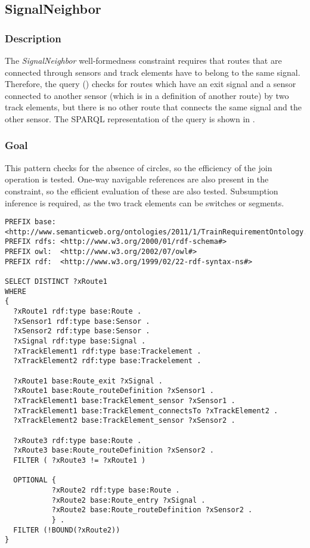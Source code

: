 \subsection{SignalNeighbor}

\subsubsection{Description} The \textit{SignalNeighbor} well-formedness constraint requires that routes that are connected through sensors and track elements have to belong to the same signal. Therefore, the query () checks for routes which have an exit signal and a sensor connected to another sensor (which is in a definition of another route) by two track elements, but there is no other route that connects the same signal and the other sensor. The SPARQL representation of the query is shown in .

\subsubsection{Goal} This pattern checks for the absence of circles, so the efficiency of the join operation is tested. One-way navigable references are also present in the constraint, so the efficient evaluation of these are also tested. Subsumption inference is required, as the two track elements can be switches or segments.

\begin{lstlisting}[caption=The RouteSensor query in SPARQL, label=lst:signalneighbor-sparql]
PREFIX base: <http://www.semanticweb.org/ontologies/2011/1/TrainRequirementOntology.owl#>
PREFIX rdfs: <http://www.w3.org/2000/01/rdf-schema#>
PREFIX owl:  <http://www.w3.org/2002/07/owl#>
PREFIX rdf:  <http://www.w3.org/1999/02/22-rdf-syntax-ns#>

SELECT DISTINCT ?xRoute1
WHERE
{
  ?xRoute1 rdf:type base:Route .
  ?xSensor1 rdf:type base:Sensor .
  ?xSensor2 rdf:type base:Sensor .
  ?xSignal rdf:type base:Signal .
  ?xTrackElement1 rdf:type base:Trackelement .
  ?xTrackElement2 rdf:type base:Trackelement .
  
  ?xRoute1 base:Route_exit ?xSignal .
  ?xRoute1 base:Route_routeDefinition ?xSensor1 .
  ?xTrackElement1 base:TrackElement_sensor ?xSensor1 .
  ?xTrackElement1 base:TrackElement_connectsTo ?xTrackElement2 .
  ?xTrackElement2 base:TrackElement_sensor ?xSensor2 .
  
  ?xRoute3 rdf:type base:Route .
  ?xRoute3 base:Route_routeDefinition ?xSensor2 .
  FILTER ( ?xRoute3 != ?xRoute1 )
  
  OPTIONAL { 
           ?xRoute2 rdf:type base:Route .
           ?xRoute2 base:Route_entry ?xSignal .
           ?xRoute2 base:Route_routeDefinition ?xSensor2 .
           } .
  FILTER (!BOUND(?xRoute2))
}
\end{lstlisting}


